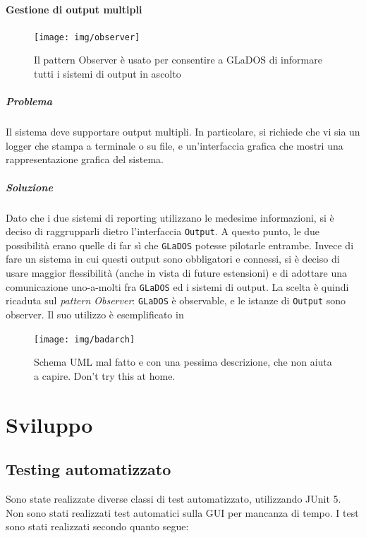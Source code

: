 \documentclass[a4paper,12pt]{report}
\begin{document}
\subsubsection{Gestione di output multipli}

\begin{figure}[H]
    \centering{}
    \texttt{[image: img/observer]}
    \caption{Il pattern Observer è usato per consentire a GLaDOS di informare tutti i sistemi di output in ascolto}
    \label{img:observer}
\end{figure}

\paragraph{Problema} Il sistema deve supportare output multipli. In particolare, si richiede che vi sia un logger che stampa a terminale o su file,
e un'interfaccia grafica che mostri una rappresentazione grafica del sistema.

\paragraph{Soluzione} Dato che i due sistemi di reporting utilizzano le medesime informazioni, si è deciso di raggrupparli dietro l'interfaccia \texttt{Output}.
A questo punto, le due possibilità erano quelle di far sì che \texttt{GLaDOS} potesse pilotarle entrambe.
Invece di fare un sistema in cui questi output sono obbligatori e connessi, si è deciso di usare maggior flessibilità (anche in vista di future estensioni)
e di adottare una comunicazione uno-a-molti fra \texttt{GLaDOS} ed i sistemi di output.
La scelta è quindi ricaduta sul \textit{pattern Observer}: \texttt{GLaDOS} è observable, e le istanze di \texttt{Output} sono observer.
%
Il suo utilizzo è esemplificato in 




\begin{figure}[h]
    \centering{}
    \texttt{[image: img/badarch]}
    \caption{Schema UML mal fatto e con una pessima descrizione, che non aiuta a capire. Don't try this at home.}
    \label{img:badarch}
\end{figure}


\chapter{Sviluppo}
\section{Testing automatizzato}
Sono state realizzate diverse classi di test automatizzato, utilizzando JUnit 5.
Non sono stati realizzati test automatici sulla GUI per mancanza di tempo.
I test sono stati realizzati secondo quanto segue:
\end{document}
